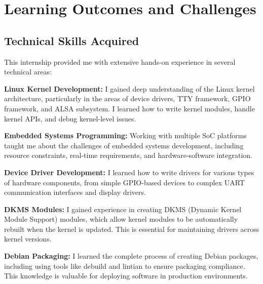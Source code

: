 \documentclass[12pt,a4paper]{report}
\begin{document}
\chapter{Learning Outcomes and Challenges}

\section{Technical Skills Acquired}

This internship provided me with extensive hands-on experience in several technical areas:

\vspace{0.3cm}

\textbf{Linux Kernel Development:} I gained deep understanding of the Linux kernel architecture, particularly in the areas of device drivers, TTY framework, GPIO framework, and ALSA subsystem. I learned how to write kernel modules, handle kernel APIs, and debug kernel-level issues.

\vspace{0.3cm}

\textbf{Embedded Systems Programming:} Working with multiple SoC platforms taught me about the challenges of embedded systems development, including resource constraints, real-time requirements, and hardware-software integration.

\vspace{0.3cm}

\textbf{Device Driver Development:} I learned how to write drivers for various types of hardware components, from simple GPIO-based devices to complex UART communication interfaces and display drivers.

\vspace{0.3cm}

\textbf{DKMS Modules:} I gained experience in creating DKMS (Dynamic Kernel Module Support) modules, which allow kernel modules to be automatically rebuilt when the kernel is updated. This is essential for maintaining drivers across kernel versions.

\vspace{0.3cm}

\textbf{Debian Packaging:} I learned the complete process of creating Debian packages, including using tools like debuild and lintian to ensure packaging compliance. This knowledge is valuable for deploying software in production environments.
\end{document}
